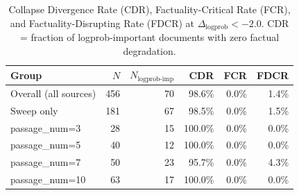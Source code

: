 \begin{table}[h]
\centering
\small
\begin{tabular}{lrrrrr}
\toprule
Group & $N$ & $N_{\text{logprob-imp}}$ & CDR & FCR & FDCR \\
\midrule
  Overall (all sources) & 456 & 70 & 98.6\% & 0.0\% & 1.4\% \\
  Sweep only & 181 & 67 & 98.5\% & 0.0\% & 1.5\% \\
  passage_num=3 & 28 & 15 & 100.0\% & 0.0\% & 0.0\% \\
  passage_num=5 & 40 & 12 & 100.0\% & 0.0\% & 0.0\% \\
  passage_num=7 & 50 & 23 & 95.7\% & 0.0\% & 4.3\% \\
  passage_num=10 & 63 & 17 & 100.0\% & 0.0\% & 0.0\% \\
\bottomrule
\end{tabular}
\caption{Collapse Divergence Rate (CDR), Factuality-Critical Rate (FCR), and
Factuality-Disrupting Rate (FDCR) at $\Delta_{\text{logprob}} < -2.0$.
CDR = fraction of logprob-important documents with zero factual degradation.}
\label{tab:e1_cdr}
\end{table}
